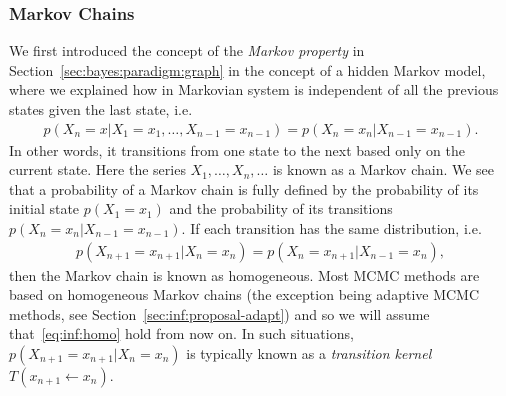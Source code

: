 \subsubsection{Markov Chains}
\label{sec:inf:foundation:mcmc:markov}

We first introduced the concept of the \emph{Markov property} in Section~\ref{sec:bayes:paradigm:graph}
in the concept of a hidden Markov model, where we explained how in Markovian system
is independent of all the previous states given the last state, i.e. 
\begin{align}
\label{eq:inf:markov-prop}
p(X_n = x | X_1 = x_1, \dots, X_{n-1} = x_{n-1}) = p(X_n = x_n  | X_{n-1} = x_{n-1}).
\end{align}
In other words, it transitions from
one state to the next based only on the current state.  Here the series $X_1,\dots,X_n,\dots$ 
is known as a Markov chain.  We see that a probability of a Markov chain is fully defined
by the probability of its initial state $p(X_1 = x_1)$ and the probability of its transitions
$p(X_n = x_n  | X_{n-1} = x_{n-1})$.  If each transition has the same distribution, i.e.
\begin{align}
\label{eq:inf:homo}
p(X_{n+1} = x_{n+1}  | X_{n} = x_{n}) = p(X_{n} = x_{n+1}  | X_{n-1} = x_{n}),
\end{align}
then the Markov chain is known as homogeneous.  Most MCMC methods are based on
homogeneous Markov chains (the exception being adaptive MCMC methods, see Section~\ref{sec:inf:proposal-adapt})
and so we will assume that~\eqref{eq:inf:homo} hold from now on.  In such situations,
$p(X_{n+1} = x_{n+1}  | X_{n} = x_{n})$ is typically known as a \emph{transition kernel}
$T(x_{n+1} \leftarrow x_n)$.

